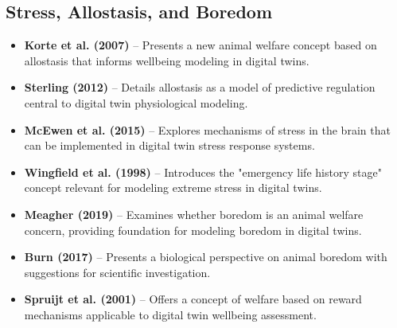 \documentclass[11pt,a4paper]{article}
\begin{document}
\subsection*{Stress, Allostasis, and Boredom}
\begin{itemize}
    \item \textbf{Korte et al. (2007)} \cite{korte2007new} -- Presents a new animal welfare concept based on allostasis that informs wellbeing modeling in digital twins.
    
    \item \textbf{Sterling (2012)} \cite{sterling2012allostasis} -- Details allostasis as a model of predictive regulation central to digital twin physiological modeling.
    
    \item \textbf{McEwen et al. (2015)} \cite{mcewen2015mechanisms} -- Explores mechanisms of stress in the brain that can be implemented in digital twin stress response systems.
    
    \item \textbf{Wingfield et al. (1998)} \cite{wingfield1998ecological} -- Introduces the "emergency life history stage" concept relevant for modeling extreme stress in digital twins.
    
    \item \textbf{Meagher (2019)} \cite{meagher2019boredom} -- Examines whether boredom is an animal welfare concern, providing foundation for modeling boredom in digital twins.
    
    \item \textbf{Burn (2017)} \cite{burn2017bestial} -- Presents a biological perspective on animal boredom with suggestions for scientific investigation.
    
    \item \textbf{Spruijt et al. (2001)} \cite{spruijt2001concept} -- Offers a concept of welfare based on reward mechanisms applicable to digital twin wellbeing assessment.
\end{itemize}
\end{document}
